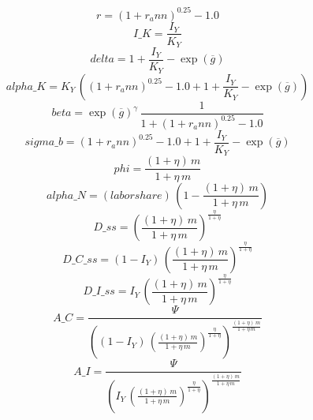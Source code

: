 \begin{dmath*}
r = \left(1+{{r_ann}}\right)^{0.25}-1.0
\end{dmath*}
\begin{dmath*}
I\_K = \frac{{{I_Y}}}{{{K_Y}}}
\end{dmath*}
\begin{dmath*}
delta = 1+\frac{{{I_Y}}}{{{K_Y}}}-\exp\left({{\overline{g}}}\right)
\end{dmath*}
\begin{dmath*}
alpha\_K = {{K_Y}}\, \left(\left(1+{{r_ann}}\right)^{0.25}-1.0+1+\frac{{{I_Y}}}{{{K_Y}}}-\exp\left({{\overline{g}}}\right)\right)
\end{dmath*}
\begin{dmath*}
beta = \exp\left({{\overline{g}}}\right)^{{{\gamma}}}\, \frac{1}{1+\left(1+{{r_ann}}\right)^{0.25}-1.0}
\end{dmath*}
\begin{dmath*}
sigma\_b = \left(1+{{r_ann}}\right)^{0.25}-1.0+1+\frac{{{I_Y}}}{{{K_Y}}}-\exp\left({{\overline{g}}}\right)
\end{dmath*}
\begin{dmath*}
phi = \frac{\left(1+{{\eta}}\right)\, {{m}}}{1+{{\eta}}\, {{m}}}
\end{dmath*}
\begin{dmath*}
alpha\_N = {(labor share)}\, \left(1-\frac{\left(1+{{\eta}}\right)\, {{m}}}{1+{{\eta}}\, {{m}}}\right)
\end{dmath*}
\begin{dmath*}
D\_ss = \left(\frac{\left(1+{{\eta}}\right)\, {{m}}}{1+{{\eta}}\, {{m}}}\right)^{\frac{{{\eta}}}{1+{{\eta}}}}
\end{dmath*}
\begin{dmath*}
D\_C\_ss = \left(1-{{I_Y}}\right)\, \left(\frac{\left(1+{{\eta}}\right)\, {{m}}}{1+{{\eta}}\, {{m}}}\right)^{\frac{{{\eta}}}{1+{{\eta}}}}
\end{dmath*}
\begin{dmath*}
D\_I\_ss = {{I_Y}}\, \left(\frac{\left(1+{{\eta}}\right)\, {{m}}}{1+{{\eta}}\, {{m}}}\right)^{\frac{{{\eta}}}{1+{{\eta}}}}
\end{dmath*}
\begin{dmath*}
A\_C = \frac{{{\Psi}}}{\left(\left(1-{{I_Y}}\right)\, \left(\frac{\left(1+{{\eta}}\right)\, {{m}}}{1+{{\eta}}\, {{m}}}\right)^{\frac{{{\eta}}}{1+{{\eta}}}}\right)^{\frac{\left(1+{{\eta}}\right)\, {{m}}}{1+{{\eta}}\, {{m}}}}}
\end{dmath*}
\begin{dmath*}
A\_I = \frac{{{\Psi}}}{\left({{I_Y}}\, \left(\frac{\left(1+{{\eta}}\right)\, {{m}}}{1+{{\eta}}\, {{m}}}\right)^{\frac{{{\eta}}}{1+{{\eta}}}}\right)^{\frac{\left(1+{{\eta}}\right)\, {{m}}}{1+{{\eta}}\, {{m}}}}}
\end{dmath*}
